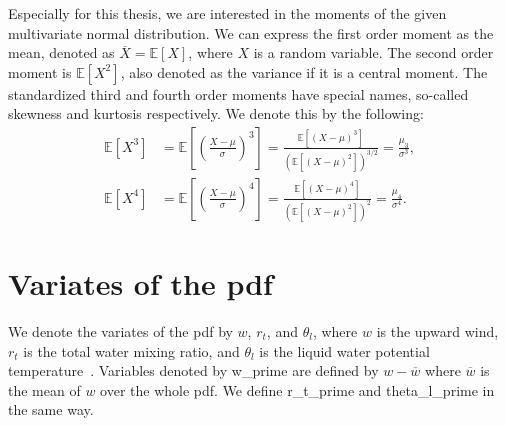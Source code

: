 Especially for this thesis, we are interested in the moments of the given multivariate normal distribution.
We can express the first order moment as the mean,
denoted as $\overline{X} = \mathbb{E}[X]$, where $X$ is a random variable.
The second order moment is $\mathbb{E}[X^2]$, also denoted as the variance if it is a central moment.
The standardized third and fourth order moments have special names,
so-called skewness and kurtosis respectively.
We denote this by the following:
\begin{align}
    \mathbb{E}[X^3]
    &= \mathbb{E}\left[\left(\frac{X-\mu}{\sigma}\right)^3\right]
    = \frac{\mathbb{E}[(X-\mu)^3]}{(\mathbb{E}[(X-\mu)^2])^{3/2}}
    = \frac{\mu_3}{\sigma^3}, \\
    \mathbb{E}[X^4]
    &= \mathbb{E}\left[\left(\frac{X-\mu}{\sigma}\right)^4\right]
    = \frac{\mathbb{E}[(X-\mu)^4]}{(\mathbb{E}[(X-\mu)^2])^2}
    = \frac{\mu_4}{\sigma^4}.
\end{align}


\section{Variates of the pdf}\label{sec:variates-of-the-pdf}

We denote the variates of the \gls{pdf} by $w$, $r_t$, and $\theta_l$,
where $w$ is the upward wind, $r_t$ is the total water mixing ratio,
and $\theta_l$ is the liquid water potential temperature~\autocite[p. 10]{larson2022clubbsilhs}.
Variables denoted by \gls{w_prime} are defined by $w - \overline{w}$
where $\overline{w}$ is the mean of $w$ over the whole pdf.
We define \gls{r_t_prime} and \gls{theta_l_prime} in the same way.